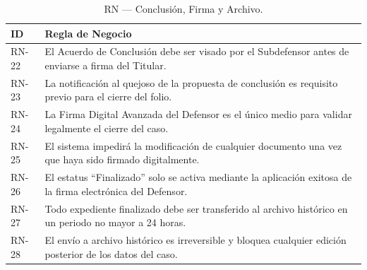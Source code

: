 \documentclass[12pt, oneside, letterpaper]{book}
\begin{document}
\begin{table}[H]
\centering
\caption{RN — Conclusión, Firma y Archivo.}
\begin{tabularx}{\textwidth}{@{} l X @{}}
\toprule
\rowcolor[HTML]{2D3E50}
\textbf{\color{white} ID} & \textbf{\color{white} Regla de Negocio} \\ \midrule
\rowcolor[HTML]{F2F4F7}
RN-22 & El Acuerdo de Conclusión debe ser visado por el Subdefensor antes de enviarse a firma del Titular. \\
RN-23 & La notificación al quejoso de la propuesta de conclusión es requisito previo para el cierre del folio. \\
\rowcolor[HTML]{F2F4F7}
RN-24 & La Firma Digital Avanzada del Defensor es el único medio para validar legalmente el cierre del caso. \\
RN-25 & El sistema impedirá la modificación de cualquier documento una vez que haya sido firmado digitalmente. \\
\rowcolor[HTML]{F2F4F7}
RN-26 & El estatus ``Finalizado'' solo se activa mediante la aplicación exitosa de la firma electrónica del Defensor. \\
RN-27 & Todo expediente finalizado debe ser transferido al archivo histórico en un periodo no mayor a 24 horas. \\
\rowcolor[HTML]{F2F4F7}
RN-28 & El envío a archivo histórico es irreversible y bloquea cualquier edición posterior de los datos del caso. \\ \bottomrule
\end{tabularx}
\end{table}
\end{document}
